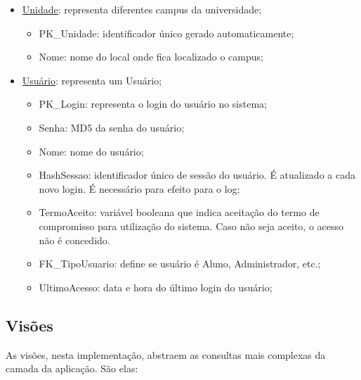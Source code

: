 \documentclass[graduacao,brazil]{ThesisPUC}
\begin{document}
\begin{itemize}
	\item \underline{Unidade}: representa diferentes campus da universidade;
	\begin{itemize}
		\item PK\_Unidade: identificador único gerado automaticamente;
		\item Nome: nome do local onde fica localizado o campus;
	\end{itemize}

	\item \underline{Usuário}: representa um Usuário;
	\begin{itemize}
		\item PK\_Login: representa o login do usuário no sistema;
		\item Senha: MD5 da senha do usuário;
		\item Nome: nome do usuário;
		\item HashSessao: identificador único de sessão do usuário. É atualizado a cada novo login. É necessário para efeito para o log;
		\item TermoAceito: variável booleana que indica aceitação do termo de compromisso para utilização do sistema. Caso não seja aceito, o acesso não é concedido.
		\item FK\_TipoUsuario: define se usuário é Aluno, Administrador, etc.;
		\item UltimoAcesso: data e hora do último login do usuário;
	\end{itemize}

\end{itemize}

\subsection{Visões}

As visões, nesta implementação, abstraem as consultas mais complexas da camada da aplicação. São elas:
\end{document}

